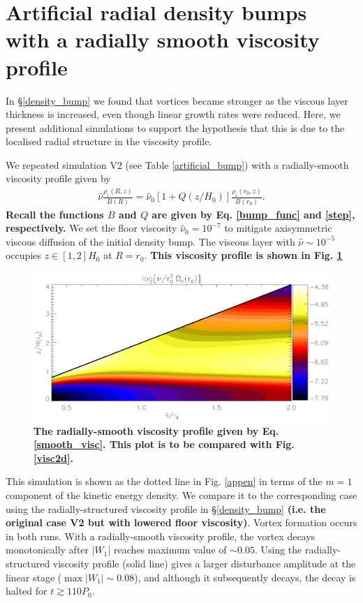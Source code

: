   \section{Artificial radial density bumps with a radially smooth
    viscosity profile}\label{add_sim}
  In \S\ref{density_bump} we found that vortices became stronger
  as the viscous layer thickness is increased, even though linear growth rates
  were reduced. Here, we present additional simulations to support the 
  hypothesis that this is due to the localised radial structure in the viscosity profile. 

  We repeated simulation V2 (see Table \ref{artificial_bump})
  with a radially-smooth viscosity profile given by 
  \begin{align}\label{smooth_visc}          
    \hat{\nu}\frac{\rho_i(R,z)}{B(R)} =
    \hat{\nu}_0\left[1+Q(z/H_0) \right]\frac{\rho_i(r_0,z)}{B(r_0)}. 
  \end{align}                  
  {\bf Recall the functions $B$ and $Q$ are given by Eq. \ref{bump_func} 
  and \ref{step}, respectively. 
  }
  We set the floor viscosity $\hat{\nu}_0=10^{-7}$ to mitigate
  axisymmetric viscous diffusion of the initial density bump. The
  viscous layer with $\hat{\nu} \sim 10^{-5}$ occupies $z\in[1,2]H_0$
  at $R=r_0$. {\bf This viscosity profile is shown in Fig. \ref{appen0}
  }  
                      
  \begin{figure}
  \centering
  \includegraphics[width=\linewidth]{figures/pdisk_visc2d_appendix.ps}
  \caption{{\bf The radially-smooth viscosity profile given by Eq. \ref{smooth_visc}.
         This plot is to be compared with Fig. \ref{visc2d}.\label{appen0}}}
  \end{figure}


  This simulation is shown as the dotted line in Fig. \ref{appen} in
  terms of the $m=1$ component of the kinetic energy density. We
  compare it to the corresponding case using the radially-structured
  viscosity profile in \S\ref{density_bump} {\bf (i.e. the original case V2 but with
  lowered floor viscosity)}. Vortex formation occurs
  in both runs.  
  With a radially-smooth viscosity profile, the vortex decays 
  monotonically after $|W_1|$ reaches maximum value of $\sim 0.05$. 
  Using the radially-structured viscosity profile (solid line) gives a
  larger disturbance amplitude at the linear stage  ($\max{|W_1|}\sim
  0.08$), and although it subsequently decays, the decay is halted for
  $t\gtrsim110P_0$.    

